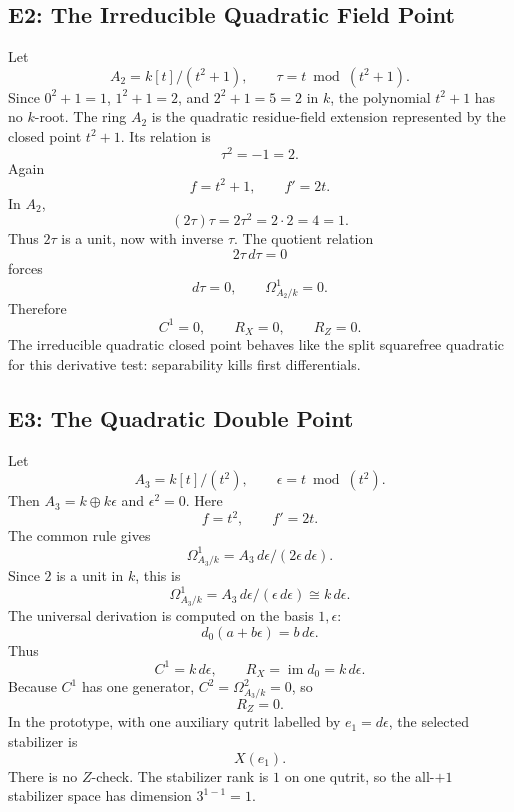 \subsection{E2: The Irreducible Quadratic Field Point}
Let
\[
  A_2=k[t]/(t^2+1),\qquad \tau=t\bmod(t^2+1).
\]
Since \(0^2+1=1\), \(1^2+1=2\), and \(2^2+1=5=2\) in \(k\), the polynomial
\(t^2+1\) has no \(k\)-root.  The ring \(A_2\) is the quadratic residue-field
extension represented by the closed point \(t^2+1\).  Its relation is
\[
  \tau^2=-1=2.
\]
Again
\[
  f=t^2+1,\qquad f'=2t.
\]
In \(A_2\),
\[
  (2\tau)\tau=2\tau^2=2\cdot2=4=1.
\]
Thus \(2\tau\) is a unit, now with inverse \(\tau\).  The quotient relation
\[
  2\tau\,d\tau=0
\]
forces
\[
  d\tau=0,\qquad \Omega^1_{A_2/k}=0.
\]
Therefore
\[
  C^1=0,\qquad R_X=0,\qquad R_Z=0.
\]
The irreducible quadratic closed point behaves like the split squarefree
quadratic for this derivative test: separability kills first differentials.
\subsection{E3: The Quadratic Double Point}
Let
\[
  A_3=k[t]/(t^2),\qquad \epsilon=t\bmod(t^2).
\]
Then \(A_3=k\oplus k\epsilon\) and \(\epsilon^2=0\).  Here
\[
  f=t^2,\qquad f'=2t.
\]
The common rule gives
\[
  \Omega^1_{A_3/k}=A_3\,d\epsilon/(2\epsilon\,d\epsilon).
\]
Since \(2\) is a unit in \(k\), this is
\[
  \Omega^1_{A_3/k}=A_3\,d\epsilon/(\epsilon\,d\epsilon)
  \cong k\,d\epsilon.
\]
The universal derivation is computed on the basis \(1,\epsilon\):
\[
  d_0(a+b\epsilon)=b\,d\epsilon.
\]
Thus
\[
  C^1=k\,d\epsilon,\qquad
  R_X=\operatorname{im}d_0=k\,d\epsilon.
\]
Because \(C^1\) has one generator, \(C^2=\Omega^2_{A_3/k}=0\), so
\[
  R_Z=0.
\]
In the prototype, with one auxiliary qutrit labelled by \(e_1=d\epsilon\), the
selected stabilizer is
\[
  X(e_1).
\]
There is no \(Z\)-check.  The stabilizer rank is \(1\) on one qutrit, so the
all-\(+1\) stabilizer space has dimension \(3^{1-1}=1\).
